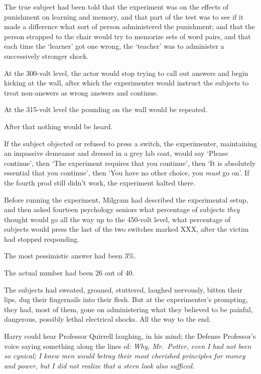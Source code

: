 The true subject had been told that the experiment was on the effects of
punishment on learning and memory, and that part of the test was to see if it
made a difference what sort of person administered the punishment; and that the
person strapped to the chair would try to memorize sets of word pairs, and that
each time the `learner' got one wrong, the `teacher' was to administer a
successively stronger shock.

At the 300-volt level, the actor would stop trying to call out answers and
begin kicking at the wall, after which the experimenter would instruct the
subjects to treat non-answers as wrong answers and continue.

At the 315-volt level the pounding on the wall would be repeated.

After that nothing would be heard.

If the subject objected or refused to press a switch, the experimenter,
maintaining an impassive demeanor and dressed in a grey lab coat, would say
`Please continue', then `The experiment requires that you continue', then `It
is absolutely essential that you continue', then `You have no other choice, you
\emph{must} go on'. If the fourth prod still didn't work, the experiment halted
there.

Before running the experiment, Milgram had described the experimental setup,
and then asked fourteen psychology seniors what percentage of subjects
\emph{they} thought would go all the way up to the 450-volt level, what
percentage of subjects would press the last of the two switches marked XXX,
after the victim had stopped responding.

The most pessimistic answer had been 3\%.

The actual number had been 26 out of 40.

The subjects had sweated, groaned, stuttered, laughed nervously, bitten their
lips, dug their fingernails into their flesh. But at the experimenter's
prompting, they had, most of them, gone on administering what they believed to
be painful, dangerous, possibly lethal electrical shocks. All the way to the
end.

Harry could hear Professor Quirrell laughing, in his mind; the Defense
Professor's voice saying something along the lines of: \emph{Why, Mr.~Potter,
even I had not been so cynical; I knew men would betray their most cherished
principles for money and power, but I did not realize that a stern look also
sufficed.}

